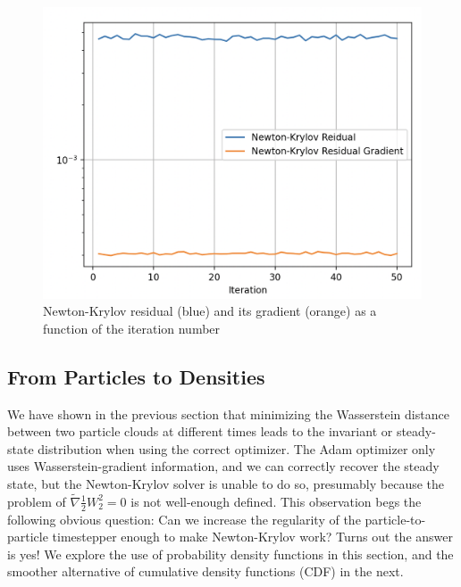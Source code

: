 \documentclass{article}
\begin{document}
\begin{figure}[ht]
    \centering
    \includegraphics[width=0.7\linewidth]{figures/Residual NK Particles.png}
    \caption{Newton-Krylov residual (blue) and its gradient (orange) as a function of the iteration number}
    \label{fig:nk_residual}
\end{figure}

\subsection{From Particles to Densities}
We have shown in the previous section that minimizing the Wasserstein distance between two particle clouds at different times leads to the invariant or steady-state distribution when using the correct optimizer. The Adam optimizer only uses Wasserstein-gradient information, and we can correctly recover the steady state, but the Newton-Krylov solver is unable to do so, presumably because the problem of $\tilde{\nabla} \frac{1}{2} W_2^2 = 0$ is not well-enough defined. This observation begs the following obvious question: Can we increase the regularity of the particle-to-particle timestepper enough to make Newton-Krylov work? Turns out the answer is yes! We explore the use of probability density functions in this section, and the smoother alternative of cumulative density functions (CDF) in the next.
\end{document}
